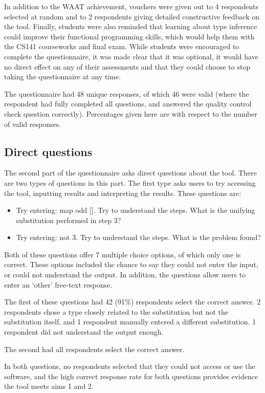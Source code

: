 \documentclass[a4paper,fleqn,oneside,12pt]{report}
\begin{document}
In addition to the WAAT achievement, vouchers were given out to 4 respondents selected at random and to 2 respondents giving detailed constructive feedback on the tool. Finally, students were also reminded that learning about type inference could improve their functional programming skills, which would help them with the CS141 courseworks and final exam. While students were encouraged to complete the questionnaire, it was made clear that it was optional, it would have no direct effect on any of their assessments and that they could choose to stop taking the questionnaire at any time.

The questionnaire had 48 unique responses, of which 46 were valid (where the respondent had fully completed all questions, and answered the quality control check question correctly). Percentages given here are with respect to the number of valid responses.
\subsection{Direct questions}\label{id:h.abykou9pzwwh}
The second part of the questionnaire asks direct questions about the tool. There are two types of questions in this part. The first type asks users to try accessing the tool, inputting results and interpreting the results. These questions are:
\begin{itemize}
  \item Try entering: map odd []. Try to understand the steps. What is the unifying substitution performed in step 3?
  \item Try entering: not 3. Try to understand the steps. What is the problem found?
\end{itemize}
Both of these questions offer 7 multiple choice options, of which only one is correct. These options included the chance to say they could not enter the input, or could not understand the output. In addition, the questions allow users to enter an ‘other’ free-text response.

The first of these questions had 42 (91\%) respondents select the correct answer. 2 respondents chose a type closely related to the substitution but not the substitution itself, and 1 respondent manually entered a different substitution. 1 respondent did not understand the output enough.

The second had all respondents select the correct answer.

In both questions, no respondents selected that they could not access or use the software, and the high correct response rate for both questions provides evidence the tool meets aims 1 and 2.
\end{document}
